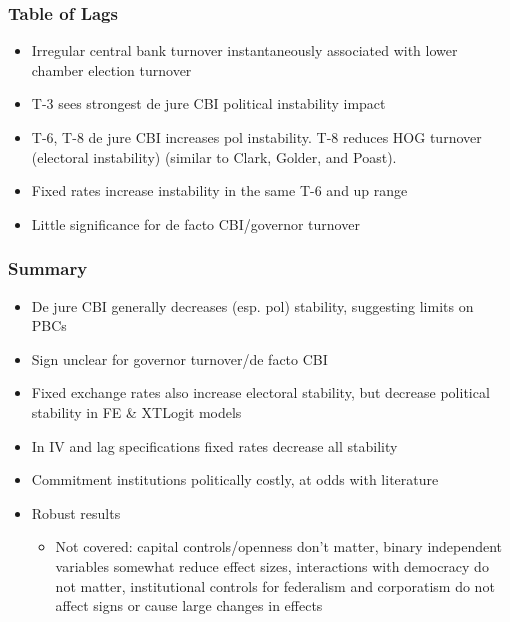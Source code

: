 \documentclass[]{beamer}
\begin{document}
\begin{frame}
\frametitle{Table of Lags}
\begin{itemize}
\item Irregular central bank turnover instantaneously associated with lower chamber election turnover
\item T-3 sees strongest de jure CBI political instability impact
\item T-6, T-8 de jure CBI increases pol instability. T-8 reduces HOG turnover (electoral instability) (similar to Clark, Golder, and Poast).
\item Fixed rates increase instability in the same T-6 and up range
\item Little significance for de facto CBI/governor turnover
\end{itemize}
\end{frame}


\begin{frame}
\frametitle{Summary}
\begin{itemize}
\item De jure CBI generally decreases (esp. pol) stability, suggesting limits on PBCs
\item Sign unclear for governor turnover/de facto CBI
\item Fixed exchange rates also increase electoral stability, but decrease political stability in FE \& XTLogit models
\item In IV and lag specifications fixed rates decrease all stability
\item Commitment institutions politically costly, at odds with literature
\item Robust results
\begin{itemize}
\item Not covered: capital controls/openness don’t matter, binary independent variables somewhat reduce effect sizes, interactions with democracy do not matter, institutional controls for federalism and corporatism do not affect signs or cause large changes in effects
\end{itemize}
\end{itemize}
\end{frame}
\end{document}
